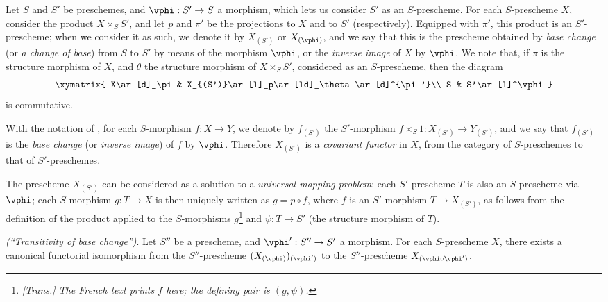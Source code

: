 \begin{env}[3.3.6]
\label{I.3.3.6}
Let $S$ and $S'$ be preschemes, and $\vphi:S'\to S$ a morphism, which lets us consider $S'$ as an
$S$-prescheme. For each $S$-prescheme $X$, consider the product $X\times_S S'$,
and let $p$ and $\pi'$ be the projections to $X$ and to $S'$ (respectively). Equipped
with $\pi'$, this product is an $S'$-prescheme; when we consider it as such, we
denote it by $X_{(S')}$ or $X_{(\vphi)}$, and we say that this is the prescheme
obtained by \emph{base change} (or \emph{a change of base}) from $S$ to $S'$ by means of the morphism
$\vphi$, or the \emph{inverse image} of $X$ by $\vphi$. We note that, if $\pi$ is
the structure morphism of $X$, and $\theta$ the structure morphism of
$X\times_S S'$, considered as an $S$-prescheme, then the diagram
\[
  \xymatrix{
    X\ar[d]_\pi &
    X_{(S')}\ar[l]_p\ar[ld]_\theta\ar[d]^{\pi'}\\
    S &
    S'\ar[l]^\vphi
  }
\]
is commutative.
\end{env}

\begin{env}[3.3.7]
\label{I.3.3.7}
With the notation of , for each $S$-morphism $f:X\to Y$, we
denote by $f_{(S')}$ the $S'$-morphism $f\times_S 1:X_{(S')}\to Y_{(S')}$, and
we say that $f_{(S')}$ is the \emph{base change} (or \emph{inverse image}) of
$f$ by $\vphi$. Therefore $X_{(S')}$ is a \emph{covariant functor} in $X$, from
the category of $S$-preschemes to that of $S'$-preschemes.
\end{env}

\begin{env}[3.3.8]
\label{I.3.3.8}
The prescheme $X_{(S')}$ can be considered as a solution to a \emph{universal
mapping problem}: each $S'$-prescheme $T$ is also an $S$-prescheme via $\vphi$;
each $S$-morphism $g:T\to X$ is then uniquely written as $g=p\circ f$, where $f$
is an $S'$-morphism $T\to X_{(S')}$, as follows from the definition of the
product applied to the $S$-morphisms $g$\footnote{\emph{[Trans.] The French
text prints $f$ here; the defining pair is $(g,\psi)$.}} and
$\psi:T\to S'$ (the structure morphism of $T$).
\end{env}

\begin{proposition}[3.3.9]
\label{I.3.3.9}
\emph{(``Transitivity of base change'')}. Let $S''$ be a prescheme, and
$\vphi':S''\to S'$ a morphism. For each $S$-prescheme $X$, there exists a
canonical functorial isomorphism from the $S''$-prescheme
$(X_{(\vphi)})_{(\vphi')}$ to the $S''$-prescheme $X_{(\vphi\circ\vphi')}$.
\end{proposition}


